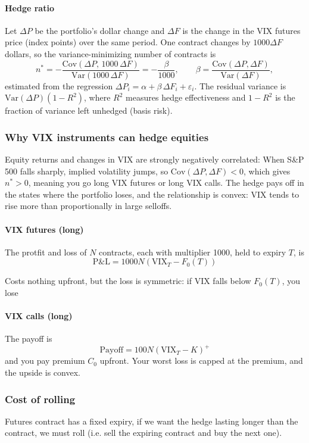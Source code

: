\paragraph{Hedge ratio}
Let $\Delta P$ be the portfolio's dollar change and $\Delta F$ is the change in the VIX futures price (index points) over the same period. One contract changes by $1000 \Delta F$ dollars, so the variance-minimizing number of contracts is
\[
    n^* = -\frac{\mathrm{Cov}(\Delta P,\,1000\,\Delta F)}{\mathrm{Var}(1000\,\Delta F)}
        = -\frac{\beta}{1000},
    \qquad
    \beta = \frac{\mathrm{Cov}(\Delta P,\Delta F)}{\mathrm{Var}(\Delta F)},
\]
estimated from the regression $\Delta P_i = \alpha + \beta\,\Delta F_i + \varepsilon_i$.
The residual variance is $\mathrm{Var}(\Delta P)(1-R^2)$, where $R^2$ measures hedge
effectiveness and $1-R^2$ is the fraction of variance left unhedged (basis risk).

\subsubsection{Why VIX instruments can hedge equities}
Equity returns and changes in VIX are strongly negatively correlated: When S\&P 500 falls sharply, implied volatility jumps, so $\mathrm{Cov}(\Delta P, \Delta F) < 0$, which gives $n^* > 0$, meaning you go long VIX futures or long VIX calls. The hedge pays off in the states where the portfolio loses, and the relationship is convex: VIX tends to rise more than proportionally in large selloffs.

\paragraph{VIX futures (long)}
The protfit and loss of $N$ contracts, each with multiplier 1000, held to expiry $T$, is
\[
    \mathrm{P\&L} = 1000 N (\mathrm{VIX}_T - F_0(T))
\]

Costs nothing upfront, but the loss is symmetric: if VIX falls below $F_0(T)$, you lose

\paragraph{VIX calls (long)}
The payoff is
\[
    \mathrm{Payoff} = 100 N (\mathrm{VIX}_T - K)^+
\]
and you pay premium $C_0$ upfront. Your worst loss is capped at the premium, and the upside is convex.


\subsubsection{Cost of rolling}
Futures contract has a fixed expiry, if we want the hedge lasting longer than the contract, we must roll (i.e. sell the expiring contract and buy the next one).

